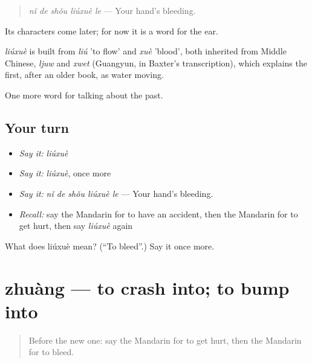 \begin{quote}
\emph{nǐ de shǒu liúxuè le} — Your hand's bleeding.
\end{quote}

Its characters come later; for now it is a word for the ear.

\begin{cousinweb}
\emph{liúxuè} is built from \emph{liú} 'to flow' and \emph{xuè} 'blood', both inherited from Middle Chinese, \emph{ljuw} and \emph{xwet} (Guangyun, in Baxter's transcription), which explains the first, after an older book, as water moving.
\end{cousinweb}

\begin{grammarlens}[title={What you've built}]
One more word for talking about the past.
\end{grammarlens}

\subsection*{Your turn}
\begin{itemize}
\raggedright
  \item \emph{Say it:} \emph{liúxuè}
  \item \emph{Say it:} \emph{liúxuè}, once more
  \item \emph{Say it:} \emph{nǐ de shǒu liúxuè le} — Your hand's bleeding.
  \item \emph{Recall:} say the Mandarin for to have an accident, then the Mandarin for to get hurt, then say \emph{liúxuè} again
\end{itemize}

\begin{tcolorbox}[breakable,colback=teal!4,colframe=teal!35!black,title={Before you move on}]
What does liúxuè mean? (\textquotedblleft{}To bleed\textquotedblright{}.) Say it once more.
\end{tcolorbox}
\section[zhuàng]{zhuàng — to crash into; to bump into}

\label{lesson:ZH-C232-zhuang}



\begin{quote}
Before the new one: say the Mandarin for to get hurt, then the Mandarin for to bleed.
\end{quote}

